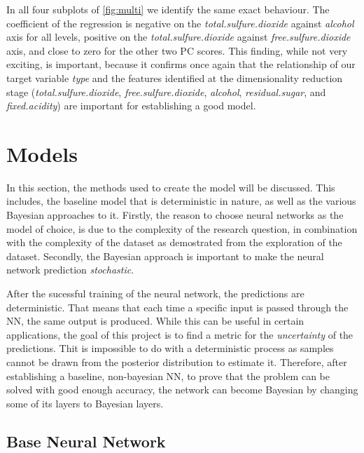 \documentclass[11pt,twoside]{article}
\numberwithin{Theorem}{section}
\numberwithin{Definition}{section}
\numberwithin{Lemma}{section}
\numberwithin{Algorithm}{section}
\numberwithin{equation}{section}
\begin{document}
In all four subplots of \autoref{fig:multi} we identify the same exact behaviour. The coefficient of the regression is negative on the \textit{total.sulfure.dioxide} against \textit{alcohol} axis for all levels, positive on the \textit{total.sulfure.dioxide} against \textit{free.sulfure.dioxide} axis, and close to zero for the other two PC scores. This finding, while not very exciting, is important, because it confirms once again that the relationship of our target variable \textit{type} and the features identified at the dimensionality reduction stage (\textit{total.sulfure.dioxide}, \textit{free.sulfure.dioxide}, \textit{alcohol}, \textit{residual.sugar}, and \textit{fixed.acidity}) are important for establishing a good model.

\section{Models}
\label{sec:methods}
In this section, the methods used to create the model will be discussed. This includes, the baseline model that is deterministic in nature, as well as the various Bayesian approaches to it. Firstly, the reason to choose neural networks as the model of choice, is due to the complexity of the research question, in combination with the complexity of the dataset as demostrated from the exploration of the dataset. Secondly, the Bayesian approach is important to make the neural network prediction \textit{stochastic}. 

After the sucessful training of the neural network, the predictions are deterministic. That means that each time a specific input is passed through the NN, the same output is produced. While this can be useful in certain applications, the goal of this project is to find a metric for the \textit{uncertainty} of the predictions. Thit is impossible to do with a deterministic process as samples cannot be drawn from  the posterior distribution to estimate it.  Therefore, after establishing a baseline, non-bayesian NN, to prove that the problem can be solved with good enough accuracy, the network can become Bayesian by changing some of its layers to Bayesian layers.

\subsection{Base Neural Network}
\label{sec:NN}
\end{document}
